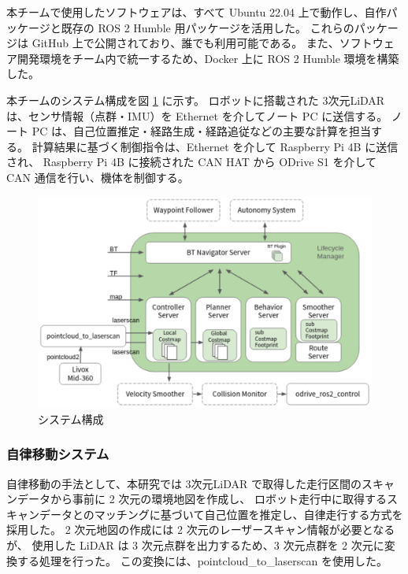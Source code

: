 \documentclass[twocolumn,9pt]{jsproceedings}
\begin{document}
本チームで使用したソフトウェアは、すべて Ubuntu 22.04 上で動作し、自作パッケージと既存の ROS 2 Humble 用パッケージを活用した。
これらのパッケージは GitHub 上で公開されており、誰でも利用可能である。
また、ソフトウェア開発環境をチーム内で統一するため、Docker 上に ROS 2 Humble 環境を構築した。

本チームのシステム構成を図 \ref{fig:shinsotu_system_diagram} に示す。
ロボットに搭載された 3次元LiDAR は、センサ情報（点群・IMU）を Ethernet を介してノート PC に送信する。
ノート PC は、自己位置推定・経路生成・経路追従などの主要な計算を担当する。
計算結果に基づく制御指令は、Ethernet を介して Raspberry Pi 4B に送信され、
Raspberry Pi 4B に接続された CAN HAT から ODrive S1 を介して CAN 通信を行い、機体を制御する。

\begin{figure}[h]
  \begin{center}
    \includegraphics[width=1.0\linewidth]{figs/shinsotu_system_diagram.pdf}
    \caption{システム構成 \cite{nav2_docs}}
    \label{fig:shinsotu_system_diagram}
  \end{center}
\end{figure}


\subsubsection{自律移動システム}

自律移動の手法として、本研究では 3次元LiDAR で取得した走行区間のスキャンデータから事前に 2 次元の環境地図を作成し、
ロボット走行中に取得するスキャンデータとのマッチングに基づいて自己位置を推定し、自律走行する方式を採用した。
2 次元地図の作成には 2 次元のレーザースキャン情報が必要となるが、
使用した LiDAR は 3 次元点群を出力するため、3 次元点群を 2 次元に変換する処理を行った。
この変換には、pointcloud\_to\_laserscan \cite{pcl_lsc} を使用した。
\end{document}
